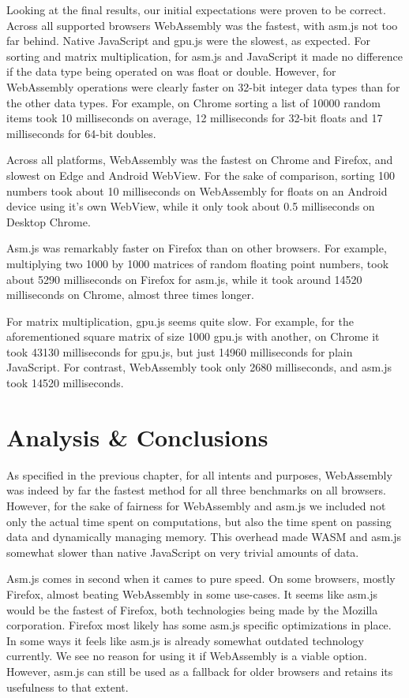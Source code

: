 \documentclass[conference]{IEEEtran}
\begin{document}
Looking at the final results, our initial expectations were proven to be
correct. Across all supported browsers WebAssembly was the fastest, with asm.js
not too far behind. Native JavaScript and gpu.js were the slowest, as expected.
For sorting and matrix multiplication, for asm.js and JavaScript it
made no difference if the data type being operated on was float or double.
However, for WebAssembly operations were clearly faster on 32-bit integer data
types than for the other data types. For example, on Chrome sorting a list of
10000 random items took 10 milliseconds on average, 12 milliseconds for 32-bit
floats and 17 milliseconds for 64-bit doubles.

Across all platforms, WebAssembly was the fastest on Chrome and Firefox, and
slowest on Edge and Android WebView. For the sake of comparison, sorting 100
numbers took about 10 milliseconds on WebAssembly for floats on an Android
device using it's own WebView, while it only took about 0.5 milliseconds on
Desktop Chrome.

Asm.js was remarkably faster on Firefox than on other browsers. For example,
multiplying two 1000 by 1000 matrices of random floating point numbers, took
about 5290 milliseconds on Firefox for asm.js, while it took around 14520
milliseconds on Chrome, almost three times longer.

For matrix multiplication, gpu.js seems quite slow. For example, for the aforementioned square
matrix of size 1000  gpu.js with another, on Chrome it took 43130
milliseconds for gpu.js, but just 14960 milliseconds for plain JavaScript. For
contrast, WebAssembly took only 2680 milliseconds, and asm.js took 14520
milliseconds.

\section{Analysis \& Conclusions}
As specified in the previous chapter, for all intents and purposes,
WebAssembly was indeed by far the fastest method for all three benchmarks on
all browsers. However, for the sake of fairness for WebAssembly and asm.js we
included not only the actual time spent on computations, but also the time
spent on passing data and dynamically managing memory. This overhead made WASM
and asm.js somewhat slower than native JavaScript on very trivial amounts of
data.

Asm.js comes in second when it cames to pure speed. On some browsers, mostly
Firefox, almost beating WebAssembly in some use-cases. It seems like asm.js
would be the fastest of Firefox, both technologies being made by the Mozilla
corporation. Firefox most likely has some asm.js specific optimizations in
place. In some ways it feels like asm.js is already somewhat outdated
technology currently. We see no reason for using it if WebAssembly is a
viable option. However, asm.js can still be used as a fallback for older
browsers and retains its usefulness to that extent.
\end{document}
